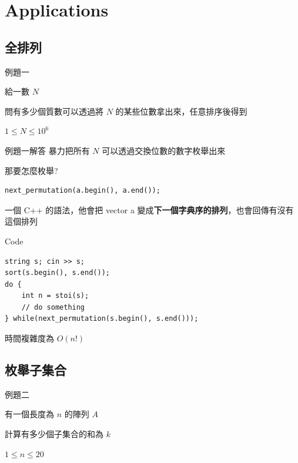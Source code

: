 
\section{Applications}

\subsection{全排列}

\begin{frame}{例題一}
    \begin{problem}
        給一數 $N$

        問有多少個質數可以透過將 $N$ 的某些位數拿出來，任意排序後得到

        $1 \le N \le 10^6$
    \end{problem}
\end{frame}

\begin{frame}[fragile]{例題一解答}
    暴力把所有 $N$ 可以透過交換位數的數字枚舉出來

    那要怎麼枚舉?\pause

\begin{lstlisting}
next_permutation(a.begin(), a.end());
\end{lstlisting}

    一個 C++ 的語法，他會把 vector a 變成\textbf{下一個字典序的排列}，也會回傳有沒有這個排列
\end{frame}

\begin{frame}[fragile]{Code}
\begin{lstlisting}
string s; cin >> s;
sort(s.begin(), s.end());
do {
    int n = stoi(s);
    // do something
} while(next_permutation(s.begin(), s.end()));
\end{lstlisting}

時間複雜度為 $O(n!)$
\end{frame}

\subsection{枚舉子集合}

\begin{frame}{例題二}
    \begin{problem}
        有一個長度為 $n$ 的陣列 $A$

        計算有多少個子集合的和為 $k$

        $1 \le n \le 20$
    \end{problem}
\end{frame}


